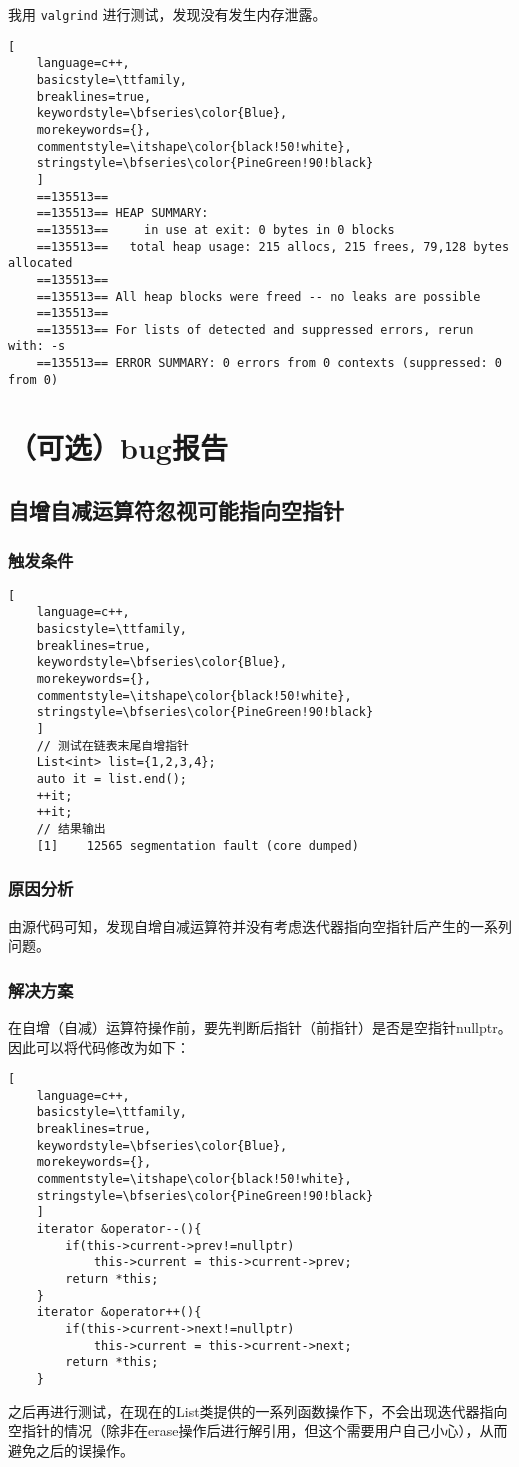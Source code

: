 \documentclass[UTF8]{ctexart}
\begin{document}
我用 \texttt{valgrind} 进行测试，发现没有发生内存泄露。
\begin{lstlisting}[ 
    language=c++,
    basicstyle=\ttfamily,
    breaklines=true,
    keywordstyle=\bfseries\color{Blue}, 
    morekeywords={}, 
    commentstyle=\itshape\color{black!50!white},
    stringstyle=\bfseries\color{PineGreen!90!black} 
    ]
    ==135513== 
    ==135513== HEAP SUMMARY:
    ==135513==     in use at exit: 0 bytes in 0 blocks
    ==135513==   total heap usage: 215 allocs, 215 frees, 79,128 bytes allocated
    ==135513== 
    ==135513== All heap blocks were freed -- no leaks are possible
    ==135513== 
    ==135513== For lists of detected and suppressed errors, rerun with: -s
    ==135513== ERROR SUMMARY: 0 errors from 0 contexts (suppressed: 0 from 0)
\end{lstlisting}
\section{（可选）bug报告}
\subsection{自增自减运算符忽视可能指向空指针}

\subsubsection{触发条件}
\begin{lstlisting}[ 
    language=c++,
    basicstyle=\ttfamily,
    breaklines=true,
    keywordstyle=\bfseries\color{Blue}, 
    morekeywords={}, 
    commentstyle=\itshape\color{black!50!white},
    stringstyle=\bfseries\color{PineGreen!90!black} 
    ]
    // 测试在链表末尾自增指针
    List<int> list={1,2,3,4};
    auto it = list.end();
    ++it;
    ++it;
    // 结果输出
    [1]    12565 segmentation fault (core dumped)
\end{lstlisting}
\subsubsection{原因分析}
由源代码可知，发现自增自减运算符并没有考虑迭代器指向空指针后产生的一系列问题。
\subsubsection{解决方案}
在自增（自减）运算符操作前，要先判断后指针（前指针）是否是空指针nullptr。因此可以将代码修改为如下：
\begin{lstlisting}[ 
    language=c++,
    basicstyle=\ttfamily,
    breaklines=true,
    keywordstyle=\bfseries\color{Blue}, 
    morekeywords={}, 
    commentstyle=\itshape\color{black!50!white},
    stringstyle=\bfseries\color{PineGreen!90!black} 
    ]
    iterator &operator--(){
        if(this->current->prev!=nullptr)
            this->current = this->current->prev;
        return *this;
    }
    iterator &operator++(){
        if(this->current->next!=nullptr)
            this->current = this->current->next;
        return *this;
    }
\end{lstlisting}
之后再进行测试，在现在的List类提供的一系列函数操作下，不会出现迭代器指向空指针的情况（除非在erase操作后进行解引用，但这个需要用户自己小心），从而避免之后的误操作。
\end{document}
